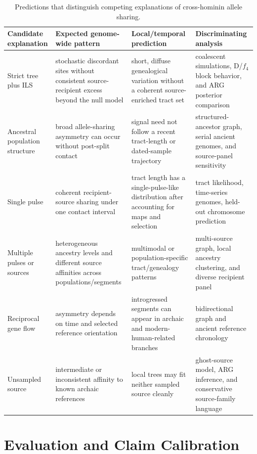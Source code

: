 \documentclass[conference]{IEEEtran}
\begin{document}
\begin{table}[t]
\caption{Predictions that distinguish competing explanations of cross-hominin allele sharing.}
\label{tab:alternatives}
\centering
\footnotesize
\begin{tabular}{L{0.19\textwidth} L{0.23\textwidth} L{0.26\textwidth} L{0.22\textwidth}}
\toprule
Candidate explanation & Expected genome-wide pattern & Local/temporal prediction & Discriminating analysis \\
\midrule
Strict tree plus ILS & stochastic discordant sites without consistent source-recipient excess beyond the null model & short, diffuse genealogical variation without a coherent source-enriched tract set & coalescent simulations, D/$f_4$ block behavior, and ARG posterior comparison \\
Ancestral population structure & broad allele-sharing asymmetry can occur without post-split contact & signal need not follow a recent tract-length or dated-sample trajectory & structured-ancestor graph, serial ancient genomes, and source-panel sensitivity \\
Single pulse & coherent recipient-source sharing under one contact interval & tract length has a single-pulse-like distribution after accounting for maps and selection & tract likelihood, time-series genomes, held-out chromosome prediction \\
Multiple pulses or sources & heterogeneous ancestry levels and different source affinities across populations/segments & multimodal or population-specific tract/genealogy patterns & multi-source graph, local ancestry clustering, and diverse recipient panel \\
Reciprocal gene flow & asymmetry depends on time and selected reference orientation & introgressed segments can appear in archaic and modern-human-related branches & bidirectional graph and ancient reference chronology \\
Unsampled source & intermediate or inconsistent affinity to known archaic references & local trees may fit neither sampled source cleanly & ghost-source model, ARG inference, and conservative source-family language \\
\bottomrule
\end{tabular}
\end{table}

\section{Evaluation and Claim Calibration}
\end{document}
